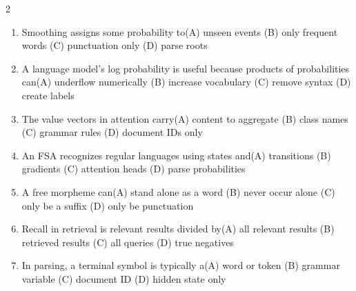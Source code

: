 \documentclass[a4paper]{article}
\begin{document}
\begin{multicols*}{2}
\begin{enumerate}
\item Smoothing assigns some probability to\newline\hspace*{0.6em}(A) unseen events \quad (B) only frequent words \newline\hspace*{0.6em}(C) punctuation only \quad (D) parse roots
\item A language model's log probability is useful because products of probabilities can\newline\hspace*{0.6em}(A) underflow numerically \quad (B) increase vocabulary \newline\hspace*{0.6em}(C) remove syntax \quad (D) create labels
\item The value vectors in attention carry\newline\hspace*{0.6em}(A) content to aggregate \quad (B) class names \newline\hspace*{0.6em}(C) grammar rules \quad (D) document IDs only
\item An FSA recognizes regular languages using states and\newline\hspace*{0.6em}(A) transitions \quad (B) gradients \newline\hspace*{0.6em}(C) attention heads \quad (D) parse probabilities
\item A free morpheme can\newline\hspace*{0.6em}(A) stand alone as a word \quad (B) never occur alone \newline\hspace*{0.6em}(C) only be a suffix \quad (D) only be punctuation
\item Recall in retrieval is relevant results divided by\newline\hspace*{0.6em}(A) all relevant results \quad (B) retrieved results \newline\hspace*{0.6em}(C) all queries \quad (D) true negatives
\item In parsing, a terminal symbol is typically a\newline\hspace*{0.6em}(A) word or token \quad (B) grammar variable \newline\hspace*{0.6em}(C) document ID \quad (D) hidden state only

\end{enumerate}
\end{multicols*}
\end{document}
